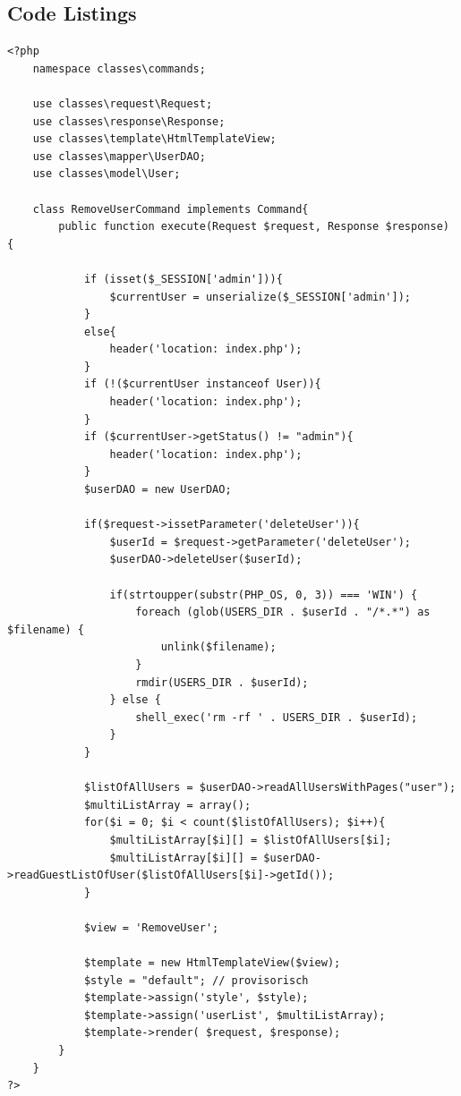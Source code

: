 \documentclass[10pt]{scrarticle}
\begin{document}
\subsection{Code Listings}

\lstset{firstnumber=1, basicstyle=\footnotesize}
\begin{lstlisting}[caption={RemoveUserCommand.php}, label={lst:RemoveUserCommand}]
<?php
    namespace classes\commands;

    use classes\request\Request;
    use classes\response\Response;
    use classes\template\HtmlTemplateView;
    use classes\mapper\UserDAO;
    use classes\model\User;

    class RemoveUserCommand implements Command{
        public function execute(Request $request, Response $response) {

            if (isset($_SESSION['admin'])){
                $currentUser = unserialize($_SESSION['admin']);
            }
            else{
                header('location: index.php');
            }
            if (!($currentUser instanceof User)){
                header('location: index.php');
            }
            if ($currentUser->getStatus() != "admin"){
                header('location: index.php');
            }
            $userDAO = new UserDAO;

            if($request->issetParameter('deleteUser')){
                $userId = $request->getParameter('deleteUser');
                $userDAO->deleteUser($userId);

                if(strtoupper(substr(PHP_OS, 0, 3)) === 'WIN') {
                    foreach (glob(USERS_DIR . $userId . "/*.*") as $filename) {
                        unlink($filename);
                    }
                    rmdir(USERS_DIR . $userId);
                } else {
                    shell_exec('rm -rf ' . USERS_DIR . $userId);
                }
            }

            $listOfAllUsers = $userDAO->readAllUsersWithPages("user");
            $multiListArray = array();
            for($i = 0; $i < count($listOfAllUsers); $i++){
                $multiListArray[$i][] = $listOfAllUsers[$i];
                $multiListArray[$i][] = $userDAO->readGuestListOfUser($listOfAllUsers[$i]->getId());
            }

            $view = 'RemoveUser';

            $template = new HtmlTemplateView($view);
            $style = "default"; // provisorisch
            $template->assign('style', $style);
            $template->assign('userList', $multiListArray);
            $template->render( $request, $response);
        }
    }
?>
\end{lstlisting}
\end{document}
